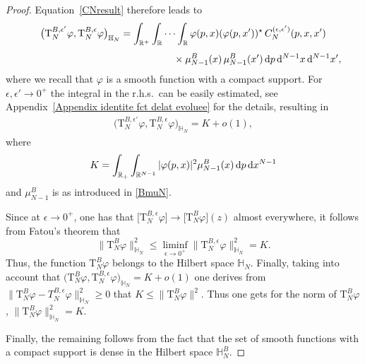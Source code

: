 \begin{proof}
Equation~\eqref{CNresult} therefore leads to
\begin{gather*}
\big( \mathrm T_{N}^{B,\epsilon'} \varphi , \mathrm T_{N}^{B,\epsilon} \varphi \big)_{\mathbb H_N}
 =\int_{\mathbb R^+} \int_{\mathbb R}\cdots \int_{\mathbb R}
\varphi(p, x)(\varphi(p, x'))^\star \,
C_N^{( \epsilon, \epsilon')}(p, x, x')
\\[1ex] \hphantom{\big( \mathrm T_{N}^{B,\epsilon'} \varphi , \mathrm T_{N}^{B,\epsilon} \varphi \big)_{\mathbb H_N}
 =\int_{\mathbb R^+} \int_{\mathbb R}\cdots \int_{\mathbb R}}
{}\times \mu_{N-1}^{B}( x) \, \mu_{N-1}^{B}( x') \, {\rm d}p\, {\rm d}^{N-1} x\, {\rm d}^{N-1} x',
\end{gather*}
where we recall that $ \varphi$ is a smooth function with a compact support. For $ \epsilon,\epsilon'\to 0^+$ the integral in the r.h.s.\ can
be easily estimated, see Appendix~\ref{Appendix identite fct delat evoluee} for the details, resulting in
\begin{gather*}
\big( \mathrm T_{N}^{B,\epsilon'} \varphi , \mathrm T_{N}^{B,\epsilon} \varphi \big)_{\mathbb H_N}= K+ o(1),
\end{gather*}
where
\begin{gather*}
K=\int_{\mathbb R_+}\int_{\mathbb R^{N-1}}
 |\varphi(p, x)|^2 \mu_{N-1}^B( x) \,{\rm d}p \, {\rm d}x ^{N-1}
\end{gather*}
and $\mu_{N-1}^{B}$ is as introduced in \eqref{BmuN}.

Since at $ \epsilon\to 0^+$, one has that $\big[ \mathrm T_{N}^{B,\epsilon}\varphi\big] \rightarrow \big[ \mathrm T_{N}^{B}\varphi\big]( z)$ almost
everywhere, it follows from Fatou's theorem that
\[
\big\| \mathrm T_{N}^{B}\varphi \big\|^2_{\mathbb H_N} \leq \liminf_{ \epsilon\to 0^+}\big\|\mathrm T_{N}^{B,\epsilon}\varphi\big\|^2_{\mathbb H_N} =K.
\]
Thus, the function $\mathrm T_{N}^{B}\varphi$ belongs to the Hilbert space $\mathbb H_N$.
Finally, taking into account that
$\big(\mathrm T_{N}^{B}\varphi,\mathrm T_{N}^{B,\epsilon}\varphi\big)_{\mathbb H_N}=K+o(1)$
one derives from $\big\|\mathrm T_{N}^{B}\varphi -T_{N}^{B,\epsilon}\varphi\big\|^2_{\mathbb H_N}\geq0$ that
$ K\leq\big\|\mathrm T_{N}^{B}\varphi\big\|^2 $. Thus one gets for the norm of $\mathrm T_{N}^{B}\varphi$,
$\big\|\mathrm T_{N}^{B}\varphi\big\|^2_{\mathbb H_N}=K.$

Finally, the remaining follows from the fact that the set of smooth functions with a compact support is dense in the Hilbert space $\mathbb H_N^{B}$.
\end{proof}

